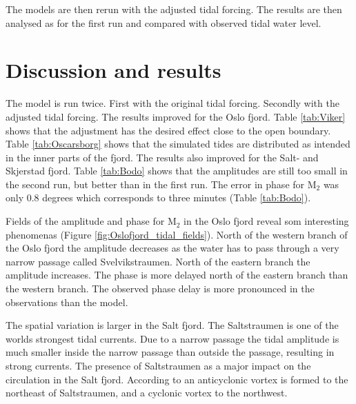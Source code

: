 The models are then rerun with the adjusted tidal forcing. The results are then analysed as for the first run and  compared with observed tidal water level. 

\section{Discussion and results}

The model is run twice. First with the original tidal forcing. Secondly with the adjusted tidal forcing. The results improved for the Oslo fjord. Table \ref{tab:Viker} shows that the adjustment has the desired effect close to the open boundary. Table \ref{tab:Oscarsborg} shows that the simulated tides are distributed as intended in the inner parts of the fjord. The results also improved for the Salt- and Skjerstad fjord. Table \ref{tab:Bodo} shows that the amplitudes are still too small in the second run, but better than in the first run. The error in phase for M$_2$ was only 0.8 degrees which corresponds to three minutes (Table \ref{tab:Bodo}).

Fields of the amplitude and phase for M$_2$ in the Oslo fjord reveal som interesting phenomenas (Figure \ref{fig:Oslofjord_tidal_fields}). North of the western branch of the Oslo fjord the amplitude decreases as the water has to pass through a very narrow passage called Svelvikstraumen. North of the eastern branch the amplitude increases. The phase is more delayed north of the eastern branch than the western branch. The observed phase delay is more pronounced in the observations than the model. 

The spatial variation is larger in the Salt fjord. The Saltstraumen is one of the worlds strongest tidal currents. Due to a narrow passage the tidal amplitude is much smaller inside the narrow passage than outside the passage, resulting in strong currents. 
The presence of Saltstraumen as a major impact on the circulation in the Salt fjord. According to \cite{svendsen96} an anticyclonic vortex is formed to the northeast of Saltstraumen, and a cyclonic vortex to the northwest.


